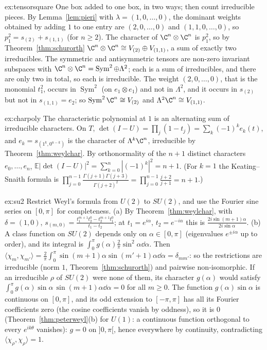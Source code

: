 \begin{solution}{ex:tensorsquare}
\idea One box added to one box, in two ways; then count irreducible pieces.
\writeup By Lemma~\ref{lem:pieri} with $\lambda=(1,0,\dots,0)$, the dominant weights obtained by adding $1$ to one entry are $(2,0,\dots,0)$ and $(1,1,0,\dots,0)$, so $p_1^2=s_{(2)}+s_{(1,1)}$ (for $n\ge2$). The character of $\C^n\otimes\C^n$ is $p_1^2$, so by Theorem~\ref{thm:schurorth}
$\C^n\otimes\C^n\cong V_{(2)}\oplus V_{(1,1)}$, a sum of exactly two irreducibles. The symmetric and antisymmetric tensors are non-zero invariant subspaces with $\C^n\otimes\C^n=\operatorname{Sym}^2\oplus\Lambda^2$; each is a sum of irreducibles, and there are only two in total, so each is
irreducible. The weight $(2,0,\dots,0)$, that is the monomial $t_1^2$, occurs in $\operatorname{Sym}^2$ (on $e_1\otimes e_1$) and not in $\Lambda^2$, and it occurs in $s_{(2)}$ but not in $s_{(1,1)}=e_2$; so $\operatorname{Sym}^2\C^n\cong V_{(2)}$ and $\Lambda^2\C^n\cong V_{(1,1)}$.
\end{solution}

\begin{solution}{ex:charpoly}
\idea The characteristic polynomial at $1$ is an alternating sum of irreducible characters.
\writeup On $T$, $\det(I-U)=\prod_j(1-t_j)=\sum_k(-1)^ke_k(t)$, and $e_k=s_{(1^k,0^{n-k})}$ is the character of $\Lambda^k\C^n$, irreducible by Theorem~\ref{thm:weylchar}. By orthonormality of the $n+1$ distinct characters $e_0,\dots,e_n$,
$\mathbb E|\det(I-U)|^2=\sum_{k=0}^n|(-1)^k|^2=n+1$. (For $k=1$ the Keating--Snaith formula is $\prod_{j=0}^{n-1}\frac{\Gamma(j+1)\Gamma(j+3)}{\Gamma(j+2)^2}=\prod_{j=0}^{n-1}\frac{j+2}{j+1}=n+1$.)
\end{solution}

\begin{solution}{ex:su2}
\idea Restrict Weyl's formula from $U(2)$ to $SU(2)$, and use the Fourier sine series on $[0,\pi]$ for completeness.
\writeup (a) By Theorem~\ref{thm:weylchar}, with $\delta=(1,0)$, $s_{(m,0)}=\frac{t_1^{m+1}t_2^0-t_2^{m+1}t_1^0}{t_1-t_2}$; at $t_1=e^{i\alpha}$, $t_2=e^{-i\alpha}$ this is $\frac{2i\sin(m+1)\alpha}{2i\sin\alpha}$.
(b) A class function on $SU(2)$ depends only on $\alpha\in[0,\pi]$ (eigenvalues $e^{\pm i\alpha}$ up to order), and its integral is $\int_0^\pi g(\alpha)\frac2\pi\sin^2\alpha\dd\alpha$. Then $\langle\chi_m,\chi_{m'}\rangle=\frac2\pi\int_0^\pi\sin(m+1)\alpha\sin(m'+1)\alpha\dd\alpha=\delta_{mm'}$:
so the restrictions are irreducible (norm $1$, Theorem~\ref{thm:schurorth}) and pairwise non-isomorphic. If an irreducible $\rho$ of $SU(2)$ were none of them, its character $g(\alpha)$ would satisfy $\int_0^\pi g(\alpha)\sin\alpha\,\sin(m+1)\alpha\dd\alpha=0$ for all $m\ge0$. The function
$g(\alpha)\sin\alpha$ is continuous on $[0,\pi]$, and its odd extension to $[-\pi,\pi]$ has all its Fourier coefficients zero (the cosine coefficients vanish by oddness), so it is $0$ (Theorem~\ref{thm:peterweyl}(b) for $U(1)$: a continuous function orthogonal to every $e^{ik\theta}$ vanishes): $g=0$ on $]0,\pi[$, hence everywhere by continuity, contradicting $\langle\chi_\rho,\chi_\rho\rangle=1$.
\end{solution}

